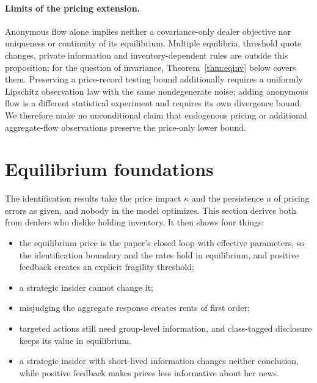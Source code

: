 \paragraph{Limits of the pricing extension.} Anonymous flow alone implies neither a covariance-only dealer objective nor uniqueness or continuity of its equilibrium. Multiple equilibria, threshold quote changes, private information and inventory-dependent rules are outside this proposition; for the question of invariance, Theorem~\ref{thm:eqinv} below covers them. Preserving a price-record testing bound additionally requires a uniformly Lipschitz observation law with the same nondegenerate noise; adding anonymous flow is a different statistical experiment and requires its own divergence bound. We therefore make no unconditional claim that endogenous pricing or additional aggregate-flow observations preserve the price-only lower bound.

\section{Equilibrium foundations}\label{sec:equilibrium}

The identification results take the price impact $\kappa$ and the persistence $a$ of pricing errors as given, and nobody in the model optimizes. This section derives both from dealers who dislike holding inventory. It then shows four things:
\begin{itemize}[itemsep=1pt,topsep=2pt]
\item the equilibrium price is the paper's closed loop with effective parameters, so the identification boundary and the rates hold in equilibrium, and positive feedback creates an explicit fragility threshold;
\item a strategic insider cannot change it;
\item misjudging the aggregate response creates rents of first order;
\item targeted actions still need group-level information, and class-tagged disclosure keeps its value in equilibrium.
\item a strategic insider with short-lived information changes neither conclusion, while positive feedback makes prices less informative about her news.
\end{itemize}

